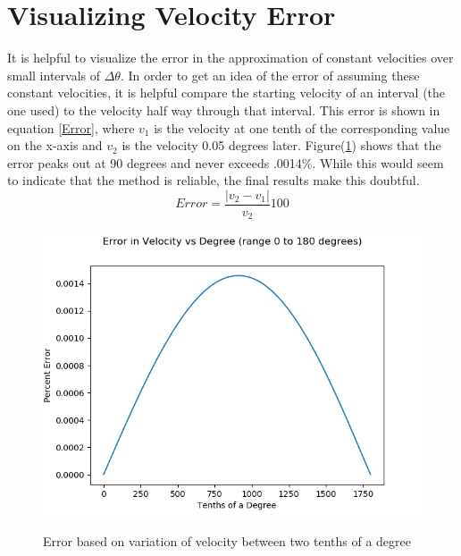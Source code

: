 \section{Visualizing Velocity Error}
\label{VelErrSec}
It is helpful to visualize the error in the approximation of constant velocities over small intervals of $\Delta\theta$.
In order to get an idea of the error of assuming these constant velocities, it is helpful compare the starting velocity
of an interval (the one used) to the velocity half way through that interval. This error is shown in equation \ref{Error},
where $v_{1}$ is the velocity at one tenth of the corresponding value on the x-axis and $v_{2}$ 
is the velocity 0.05 degrees later. Figure(\ref{ErrPlot}) shows that the error peaks out at 90 degrees and never exceeds
.0014\%. While this would seem to indicate that the method is reliable, the final results make this doubtful.
\begin{equation}
	Error = \frac{|v_{2}-v_{1}|}{v_{2}}100
	\label{Error}
\end{equation}
\begin{figure}
	\includegraphics[scale = 0.8]{VelocityError.png}
	\label{ErrPlot}
	\caption{Error based on variation of velocity between two tenths of a degree}
\end{figure}
%
